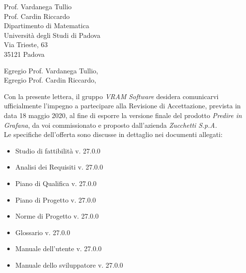 \documentclass[a4paper,12pt]{letteracdp}
\date{14 maggio 2020}
\begin{document}
\begin{letter}{
		Prof. Vardanega Tullio \\
		Prof. Cardin Riccardo \\
		Dipartimento di Matematica \\
		Università degli Studi di Padova \\
		Via Trieste, 63 \\
		35121 Padova}
	
	\opening{Egregio Prof. Vardanega Tullio, \\ \noindent Egregio Prof. Cardin Riccardo,}
	
	\begin{flushleft}
	Con la presente lettera, il gruppo \textit{VRAM Software} desidera comunicarvi ufficialmente l'impegno a partecipare alla Revisione di Accettazione, prevista in data 18 maggio 2020, al fine di esporre la versione finale del prodotto \textit{Predire in Grafana}, da voi commissionato e proposto dall'azienda \textit{Zucchetti S.p.A.} \\
	Le specifiche dell'offerta sono discusse in dettaglio nei documenti allegati: \\ 
	\end{flushleft}

	\begin{itemize}
		\item Studio di fattibilità v. 27.0.0
		\item Analisi dei Requisiti v. 27.0.0
		\item Piano di Qualifica v. 27.0.0
		\item Piano di Progetto v. 27.0.0
		\item Norme di Progetto v. 27.0.0
		\item Glossario v. 27.0.0
		
		\item Manuale dell'utente v. 27.0.0
		\item Manuale dello sviluppatore v. 27.0.0
		

\end{itemize}
\end{letter}
\end{document}
